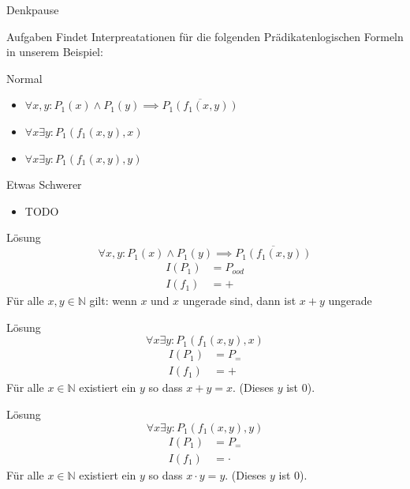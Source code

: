{
\begin{frame}[fragile]{Denkpause}
    \footnotesize
        \begin{alertblock}{Aufgaben}
            Findet Interpreatationen für die folgenden Prädikatenlogischen Formeln in unserem Beispiel:
        \end{alertblock}
        \begin{block}{Normal}
            \begin{itemize}
                \item $\forall x,y : P_1(x) \wedge P_1(y) \implies \overline{P_1(f_1(x,y))}$
                \item $\forall x\exists y: P_1(f_1(x,y),x)$
                \item $\forall x\exists y: P_1(f_1(x,y),y)$
            \end{itemize}
        \end{block}
        \begin{block}{Etwas Schwerer}
            \begin{itemize}
                \item TODO
            \end{itemize}
        \end{block}
\end{frame}

\begin{frame}{Lösung}
    $$\forall x,y : P_1(x) \wedge P_1(y) \implies \overline{P_1(f_1(x,y))}$$
        \begin{align*}
            I(P_1) &= P_{ood}\\
            I(f_1) &= +
        \end{align*}
        Für alle $x,y \in \mathbb N$ gilt: wenn $x$ und $x$ ungerade sind, dann ist $x+y$ ungerade
\end{frame}

\begin{frame}{Lösung}
    $$\forall x\exists y: P_1(f_1(x,y),x)$$
        \begin{align*}
            I(P_1) &= P_{=}\\
            I(f_1) &= +
        \end{align*}
        Für alle $x \in \mathbb N$ existiert ein $y$ so dass $x+y = x$. (Dieses $y$ ist $0$).
\end{frame}

\begin{frame}{Lösung}
    $$\forall x\exists y: P_1(f_1(x,y),y)$$
        \begin{align*}
            I(P_1) &= P_{=}\\
            I(f_1) &= \cdot
        \end{align*}
        Für alle $x \in \mathbb N$ existiert ein $y$ so dass $x\cdot y = y$. (Dieses $y$ ist $0$).
\end{frame}
}